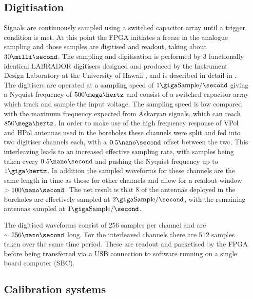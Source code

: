 \subsection{Digitisation}
\label{sec:ara-detector:TestBed:Digitisation}

Signals are continuously sampled using a switched capacitor array until a trigger condition is met. At this point the FPGA initiates a freeze in the analogue sampling and those samples are digitised and readout, taking about $30 \milli \second$. The sampling and digitisation is performed by 3 functionally identical LABRADOR digitisers designed and produced by the Instrument Design Laboratory at the University of Hawaii \cite{Varner2007447}, and is described in detail in . The digitisers are operated at a sampling speed of $1 \giga \mbox{Sample} /\second$ giving a Nyquist frequency of $500 \mega \hertz$ and consist of a switched capacitor array which track and sample the input voltage. The sampling speed is low compared with the maximum frequency expected from Askaryan signals, which can reach $850 \mega \hertz$. In order to make use of the high frequency response of VPol and HPol antennas used in the boreholes these channels were split and fed into two digitiser channels each, with a $0.5 \nano \second$ offset between the two. This interleaving leads to an increased effective sampling rate, with samples being taken every $0.5 \nano \second$ and pushing the Nyquist frequency up to $1 \giga \hertz$. In addition the sampled waveforms for these channels are the same length in time as those for other channels and allow for a readout window $> 100 \nano \second$. The net result is that 8 of the antennas deployed in the boreholes are effectively sampled at $2 \giga \mbox{Sample} /\second$, with the remaining antennas sampled at $1 \giga \mbox{Sample} /\second$.

The digitised waveforms consist of 256 samples per channel and are $\sim 256 \nano \second$ long. For the interleaved channels there are 512 samples taken over the same time period. These are readout and packetised by the FPGA before being transferred via a USB connection to software running on a single board computer (SBC).

\subsection{Calibration systems}
\label{sec:ara-detector:TestBed:Calibration-systems}

